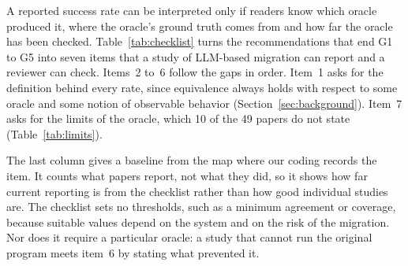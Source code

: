 \begin{added}
A reported success rate can be interpreted only if readers know which oracle produced it, where the oracle's ground truth comes from and how far the oracle has been checked. Table~\ref{tab:checklist} turns the recommendations that end G1 to G5 into seven items that a study of LLM-based migration can report and a reviewer can check. Items~2 to~6 follow the gaps in order. Item~1 asks for the definition behind every rate, since equivalence always holds with respect to some oracle and some notion of observable behavior (Section~\ref{sec:background}). Item~7 asks for the limits of the oracle, which 10 of the 49 papers do not state (Table~\ref{tab:limits}).

The last column gives a baseline from the map where our coding records the item. It counts what papers report, not what they did, so it shows how far current reporting is from the checklist rather than how good individual studies are. The checklist sets no thresholds, such as a minimum agreement or coverage, because suitable values depend on the system and on the risk of the migration. Nor does it require a particular oracle: a study that cannot run the original program meets item~6 by stating what prevented it.
\end{added}
